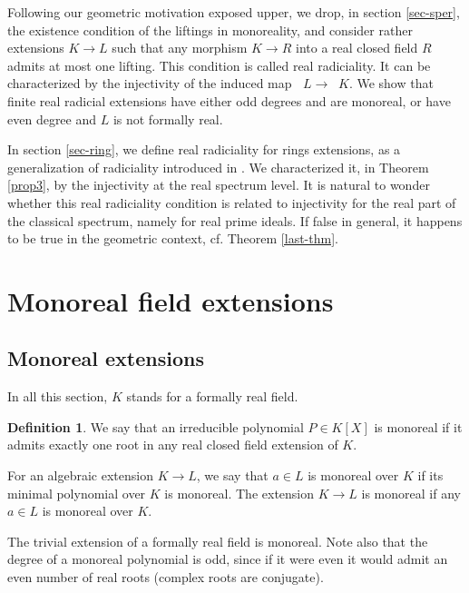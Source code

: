 \documentclass[12pt]{amsart}
\theoremstyle{definition}
\newtheorem{defn}[thm]{Definition}
\DeclareMathOperator{\Spr}{Spec_r}
\begin{document}
Following our geometric motivation exposed upper, we drop, in section \ref{sec-sper}, the existence condition of the liftings in monoreality, and consider rather extensions $K\to L$ such that any morphism
$K\to R$ into a real closed field $R$ admits at most one lifting. This condition is called real radiciality. It can be characterized by the injectivity of the induced map $\Spr L\to\Spr K$. 
We show that finite real radicial extensions have either odd degrees and are monoreal, or have even degree and $L$ is not formally real.

In section \ref{sec-ring}, we define real radiciality for rings extensions, as a generalization of radiciality introduced in \cite{Gr1}.
We characterized it, in Theorem \ref{prop3}, by the injectivity at the real spectrum level. It is natural to wonder whether this real radiciality condition is related to injectivity for the real part of the classical spectrum, namely  for real prime ideals. If false in general, it happens to be true in the geometric context, cf. Theorem \ref{last-thm}.









\section{Monoreal field extensions}



\subsection{Monoreal extensions}\label{sect-mono}
In all this section, 
$K$ stands for a formally real field.


\begin{defn} 
	We say that an irreducible polynomial $P\in K[X]$ is monoreal if it admits exactly one root in any real closed field extension of $K$.
	
	For an algebraic extension $K\to L$, we say that $a\in L$ is monoreal over $K$ if its minimal polynomial over $K$ is monoreal. The extension $K\to L$ is monoreal if any $a\in L$ is monoreal over $K$.	
\end{defn}	

The trivial extension of a formally real field is monoreal. Note also that the degree of a monoreal polynomial is odd, since if it were even it would admit an even number of real roots (complex roots are conjugate).
\end{document}
